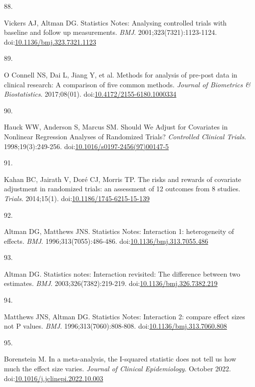 \documentclass[
]{book}
\newlength{\cslhangindent}
\newlength{\csllabelwidth}
\newlength{\cslentryspacingunit} %
\newenvironment{CSLReferences}[2] %
 {%
  \setlength{\parindent}{0pt}
  \ifodd #1
  \let\oldpar\par
  \def\par{\hangindent=\cslhangindent\oldpar}
  \fi
  \setlength{\parskip}{#2\cslentryspacingunit}
 }%
 {}
\newcommand{\CSLLeftMargin}[1]{\parbox[t]{\csllabelwidth}{#1}}
\newcommand{\CSLRightInline}[1]{\parbox[t]{\linewidth - \csllabelwidth}{#1}\break}
\begin{document}
\begin{CSLReferences}{0}{0}
\leavevmode{}%
\CSLLeftMargin{88. }%
\CSLRightInline{Vickers AJ, Altman DG. Statistics Notes: Analysing controlled trials with baseline and follow up measurements. \emph{BMJ}. 2001;323(7321):1123-1124. doi:\href{https://doi.org/10.1136/bmj.323.7321.1123}{10.1136/bmj.323.7321.1123}}

\leavevmode{}%
\CSLLeftMargin{89. }%
\CSLRightInline{O Connell NS, Dai L, Jiang Y, et al. Methods for analysis of pre-post data in clinical research: A comparison of five common methods. \emph{Journal of Biometrics \& Biostatistics}. 2017;08(01). doi:\href{https://doi.org/10.4172/2155-6180.1000334}{10.4172/2155-6180.1000334}}

\leavevmode{}%
\CSLLeftMargin{90. }%
\CSLRightInline{Hauck WW, Anderson S, Marcus SM. Should We Adjust for Covariates in Nonlinear Regression Analyses of Randomized Trials? \emph{Controlled Clinical Trials}. 1998;19(3):249-256. doi:\href{https://doi.org/10.1016/s0197-2456(97)00147-5}{10.1016/s0197-2456(97)00147-5}}

\leavevmode{}%
\CSLLeftMargin{91. }%
\CSLRightInline{Kahan BC, Jairath V, Doré CJ, Morris TP. The risks and rewards of covariate adjustment in randomized trials: an assessment of 12 outcomes from 8 studies. \emph{Trials}. 2014;15(1). doi:\href{https://doi.org/10.1186/1745-6215-15-139}{10.1186/1745-6215-15-139}}

\leavevmode{}%
\CSLLeftMargin{92. }%
\CSLRightInline{Altman DG, Matthews JNS. Statistics Notes: Interaction 1: heterogeneity of effects. \emph{BMJ}. 1996;313(7055):486-486. doi:\href{https://doi.org/10.1136/bmj.313.7055.486}{10.1136/bmj.313.7055.486}}

\leavevmode{}%
\CSLLeftMargin{93. }%
\CSLRightInline{Altman DG. Statistics notes: Interaction revisited: The difference between two estimates. \emph{BMJ}. 2003;326(7382):219-219. doi:\href{https://doi.org/10.1136/bmj.326.7382.219}{10.1136/bmj.326.7382.219}}

\leavevmode{}%
\CSLLeftMargin{94. }%
\CSLRightInline{Matthews JNS, Altman DG. Statistics Notes: Interaction 2: compare effect sizes not P values. \emph{BMJ}. 1996;313(7060):808-808. doi:\href{https://doi.org/10.1136/bmj.313.7060.808}{10.1136/bmj.313.7060.808}}

\leavevmode{}%
\CSLLeftMargin{95. }%
\CSLRightInline{Borenstein M. In a meta-analysis, the I-squared statistic does not tell us how much the effect size varies. \emph{Journal of Clinical Epidemiology}. October 2022. doi:\href{https://doi.org/10.1016/j.jclinepi.2022.10.003}{10.1016/j.jclinepi.2022.10.003}}


\end{CSLReferences}
\end{document}
